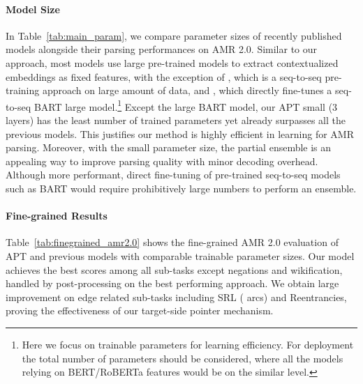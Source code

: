 \paragraph{Model Size}
In Table~\ref{tab:main_param}, we compare parameter sizes of recently published models alongside their parsing performances on AMR 2.0.
Similar to our approach, most models use large pre-trained models to extract contextualized embeddings as fixed features, with the exception of \citet{xu2020improving}, which is a seq-to-seq pre-training approach on large amount of data, and \citet{bevilacqua2021one}, which directly fine-tunes a seq-to-seq BART large \citep{lewis2019bart} model.\footnote{Here we focus on trainable parameters for learning efficiency. For deployment the total number of parameters should be considered, where all the models relying on BERT/RoBERTa features would be on the similar level.}
Except the large BART model, our APT small (3 layers) has the least number of trained parameters yet already surpasses all the previous models. This justifies our method is highly efficient in learning for AMR parsing.
Moreover, with the small parameter size, the partial ensemble is an appealing way to improve parsing quality with minor decoding overhead. Although more performant, direct fine-tuning of pre-trained seq-to-seq models such as BART would require prohibitively large numbers to perform an ensemble.

\paragraph{Fine-grained Results}
Table~\ref{tab:finegrained_amr2.0} shows the fine-grained AMR 2.0 evaluation  \citep{damonte2016incremental} of APT and previous models with comparable trainable parameter sizes. Our model achieves the best scores among all sub-tasks except negations and wikification, handled by post-processing on the best performing approach.
We obtain large improvement on edge related sub-tasks including SRL ( arcs) and Reentrancies, proving the effectiveness of our target-side pointer mechanism.





